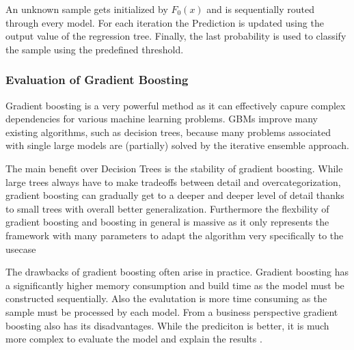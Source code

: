 An unknown sample gets initialized by \(F_{0}(x)\) and is sequentially routed through every model. For each iteration the 
Prediction is updated using the output value of the regression tree. Finally, the last probability is used to classify 
the sample using the predefined threshold. 

\subsubsection{Evaluation of Gradient Boosting}

Gradient boosting is a very powerful method as it can effectively capure complex dependencies for various machine 
learning problems. \ac{GBM}s improve many existing algorithms, such as decision trees, because many problems associated 
with single large models are (partially) solved by the iterative ensemble approach.

The main benefit over Decision Trees is the stability of gradient boosting. While large trees always have to make tradeoffs 
between detail and overcategorization, gradient boosting can gradually get to a deeper and deeper level of detail thanks to 
small trees with overall better generalization. Furthermore the flexbility of gradient boosting and boosting in general is massive 
as it only represents the framework with many parameters to adapt the algorithm very specifically to the usecase \cite[7.2]{Natekin2013}

The drawbacks of gradient boosting often arise in practice. Gradient boosting has a significantly higher memory consumption and 
build time as the model must be constructed sequentially. Also the evalutation is more time consuming as the sample must be processed 
by each model. From a business perspective gradient boosting also has its disadvantages. While the prediciton is better, it is much 
more complex to evaluate the model and explain the results \cite[7.2]{Natekin2013} \cite[p.27]{Buhlmann2004Bagging}. 